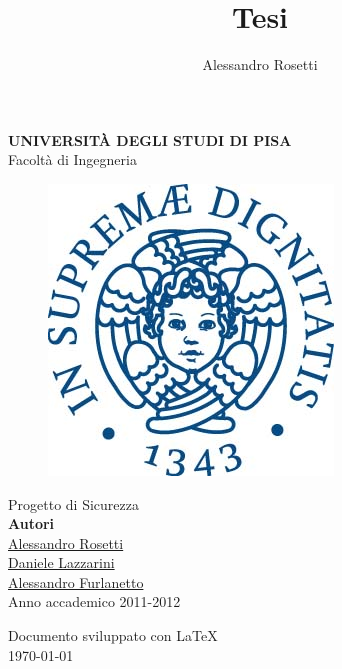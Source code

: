 \documentclass[a4paper,titlepage]{article}
\author{Alessandro Rosetti}
\title{Tesi}
\begin{document}
\begin{titlepage}
\begin{center}
\huge{\textbf{UNIVERSIT\`A DEGLI STUDI DI PISA}}\\
\LARGE{Facoltà di Ingegneria}
\begin{figure}[H]
  \centering \includegraphics[scale=0.35]{img/unipi.jpg}
\end{figure}
\vspace{2.5cm}
\Huge{Progetto di Sicurezza}\\[2.5cm]

\large{\textbf{Autori}}\\
\underline{\Large{Alessandro Rosetti}}\\
\underline{\Large{Daniele Lazzarini}}\\
\underline{\Large{Alessandro Furlanetto}}\\


\vfill
\large{Anno accademico 2011-2012}\\[2.0cm]
\end{center}
\end{titlepage}

\begin{center}
\thispagestyle{empty}
\newpage
\vfill
Documento sviluppato con \LaTeX\\
\today
\end{center}

\newpage

\tableofcontents \thispagestyle{fancy}
\newpage
\listoffigures
\newpage



\end{document}

